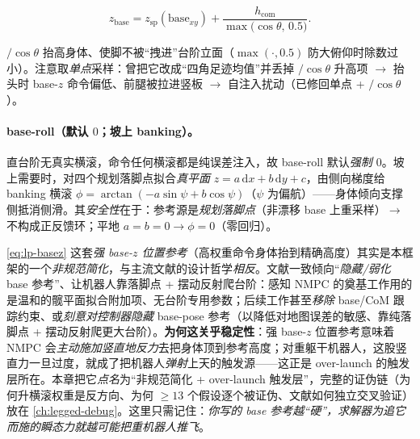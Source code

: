 \begin{equation}
  z_{\mathrm{base}} = z_{\mathrm{sp}}(\text{base}_{xy}) + \frac{h_{\mathrm{com}}}{\max\!\big(\cos\theta,\,0.5\big)}.
  \label{eq:lp-basez}
\end{equation}

$/\cos\theta$ 抬高身体、使脚不被“拽进”台阶立面（$\max(\cdot,0.5)$ 防大俯仰时除数过小）。注意取\emph{单点}采样：曾把它改成“四角足迹均值”并丢掉 $/\cos\theta$ 升高项 $\to$ 抬头时 base-$z$ 命令偏低、前腿被拉进竖板 $\to$ 自注入扰动（已修回单点 + $/\cos\theta$）。

\paragraph{base-roll（默认 $0$；坡上 banking）。}
直台阶无真实横滚，命令任何横滚都是纯误差注入，故 base-roll 默认\emph{强制 $0$}。坡上需要时，对四个规划落脚点拟合\emph{真平面} $z=a\,\mathrm{d}x+b\,\mathrm{d}y+c$，由侧向梯度给 banking 横滚 $\phi=\arctan(-a\sin\psi+b\cos\psi)$（$\psi$ 为偏航）——身体倾向支撑侧抵消侧滑。其\emph{安全性}在于：参考源是\emph{规划落脚点}（非漂移 base 上重采样）$\to$ 不构成正反馈环；平地 $a=b=0\to\phi=0$（零回归）。

\begin{insight}\label{ins:lp-strong-baseref}
\cref{eq:lp-basez} 这套\emph{强 base-$z$ 位置参考}（高权重命令身体抬到精确高度）其实是本框架的一个\emph{非规范简化}，与主流文献的设计哲学\emph{相反}。文献一致倾向“\emph{隐藏/弱化} base 参考”、让机器人靠落脚点 + 摆动反射爬台阶：感知 NMPC 的奠基工作\cite{grandia2022perceptive}用的是温和的髋平面拟合附加项、无台阶专用参数；后续工作甚至\emph{移除} base/CoM 跟踪约束、或\emph{刻意对控制器隐藏} base-pose 参考（以降低对地图误差的敏感、靠纯落脚点 + 摆动反射爬更大台阶）。\textbf{为何这关乎稳定性}：强 base-$z$ 位置参考意味着 NMPC 会\emph{主动施加竖直地反力}去把身体顶到参考高度；对重躯干机器人，这股竖直力一旦过度，就成了把机器人\emph{弹射}上天的触发源——这正是 over-launch 的触发层所在。本章把它\emph{点名}为“非规范简化 + over-launch 触发层”，完整的证伪链（为何升横滚权重是反方向、为何 $\ge 13$ 个假设逐个被证伪、文献如何独立交叉验证）放在 \cref{ch:legged-debug}。这里只需记住：\emph{你写的 base 参考越“硬”，求解器为追它而施的瞬态力就越可能把重机器人推飞}。
\end{insight}

